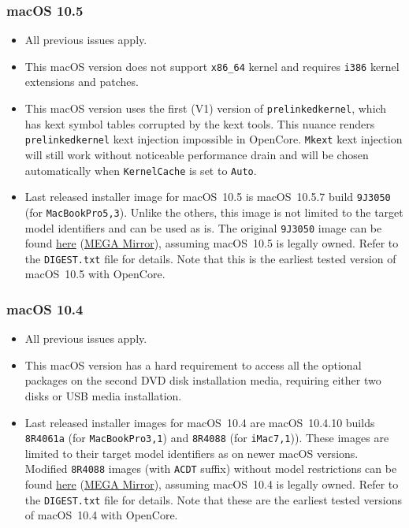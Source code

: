\documentclass[]{article}
\makeatletter
\renewcommand{\label}[1]{%
\zref@wrapper@immediate{\oldlabel{#1}}}  %
\makeatother
\begin{document}
\subsubsection{macOS 10.5}\label{legacy105}

\begin{itemize}
  \item All previous issues apply.
  \item This macOS version does not support \texttt{x86\_64} kernel
    and requires \texttt{i386} kernel extensions and patches.
  \item This macOS version uses the first (V1) version of \texttt{prelinkedkernel},
    which has kext symbol tables corrupted by the kext tools. This nuance
    renders \texttt{prelinkedkernel} kext injection impossible in OpenCore.
    \texttt{Mkext} kext injection will still work without noticeable
    performance drain and will be chosen automatically when
    \texttt{KernelCache} is set to \texttt{Auto}.
  \item Last released installer image for macOS~10.5 is macOS~10.5.7
    build \texttt{9J3050} (for \texttt{MacBookPro5,3}). Unlike the others,
    this image is not limited to the target model identifiers and can be used
    as is. The original \texttt{9J3050} image can be found
    \href{https://archive.org/details/10.5.7-9-j-3050}{here}
    (\href{https://mega.nz/folder/inRBTarD#zanf7fUbviwz3WHBU5xpCg}{MEGA Mirror}),
    assuming macOS~10.5 is legally owned. Refer to the \texttt{DIGEST.txt} file
    for details. Note that this is the earliest tested
    version of macOS~10.5 with OpenCore.
\end{itemize}

\subsubsection{macOS 10.4}\label{legacy104}

\begin{itemize}
  \item All previous issues apply.
  \item This macOS version has a hard requirement to access all the optional
    packages on the second DVD disk installation media, requiring either two
    disks or USB media installation.
  \item Last released installer images for macOS~10.4 are macOS~10.4.10
    builds \texttt{8R4061a} (for \texttt{MacBookPro3,1}) and
    \texttt{8R4088} (for \texttt{iMac7,1})). These images are limited
    to their target model identifiers as on newer macOS versions.
    Modified \texttt{8R4088} images (with \texttt{ACDT} suffix) without
    model restrictions can be found
    \href{https://archive.org/details/10.4.10-8-r-4088-acdt}{here}
    (\href{https://mega.nz/folder/D3ASzLzA\#7sjYXE2X09f6aGjol\_C7dg}{MEGA Mirror}),
    assuming macOS~10.4 is legally owned. Refer to the \texttt{DIGEST.txt} file
    for details. Note that these are the earliest tested
    versions of macOS~10.4 with OpenCore.
\end{itemize}
\end{document}
